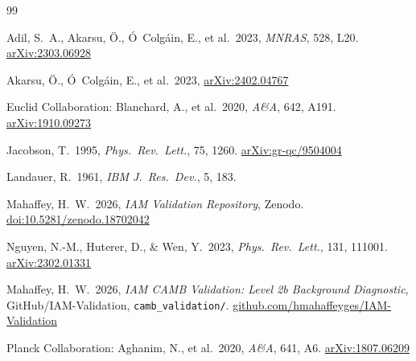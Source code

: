 \documentclass[12pt,a4paper]{article}
\begin{document}
\begin{thebibliography}{99}

Adil, S.~A., Akarsu, \"{O}., \'{O}~Colg\'{a}in, E., et al.\ 2023,
\textit{MNRAS}, 528, L20.
\href{https://arxiv.org/abs/2303.06928}{arXiv:2303.06928}

Akarsu, \"{O}., \'{O}~Colg\'{a}in, E., et al.\ 2023,
\href{https://arxiv.org/abs/2402.04767}{arXiv:2402.04767}

Euclid Collaboration: Blanchard, A., et al.\ 2020,
\textit{A\&A}, 642, A191.
\href{https://arxiv.org/abs/1910.09273}{arXiv:1910.09273}

Jacobson, T.\ 1995,
\textit{Phys.\ Rev.\ Lett.}, 75, 1260.
\href{https://arxiv.org/abs/gr-qc/9504004}{arXiv:gr-qc/9504004}

Landauer, R.\ 1961,
\textit{IBM J.\ Res.\ Dev.}, 5, 183.

Mahaffey, H.~W.\ 2026,
\textit{IAM Validation Repository},
Zenodo.
\href{https://doi.org/10.5281/zenodo.18702042}{doi:10.5281/zenodo.18702042}

Nguyen, N.-M., Huterer, D., \& Wen, Y.\ 2023,
\textit{Phys.\ Rev.\ Lett.}, 131, 111001.
\href{https://arxiv.org/abs/2302.01331}{arXiv:2302.01331}

Mahaffey, H.~W.\ 2026,
\textit{IAM CAMB Validation: Level 2b Background Diagnostic},
GitHub/IAM-Validation, \texttt{camb\_validation/}.
\href{https://github.com/hmahaffeyges/IAM-Validation}{github.com/hmahaffeyges/IAM-Validation}

Planck Collaboration: Aghanim, N., et al.\ 2020,
\textit{A\&A}, 641, A6.
\href{https://arxiv.org/abs/1807.06209}{arXiv:1807.06209}

\end{thebibliography}
\end{document}
